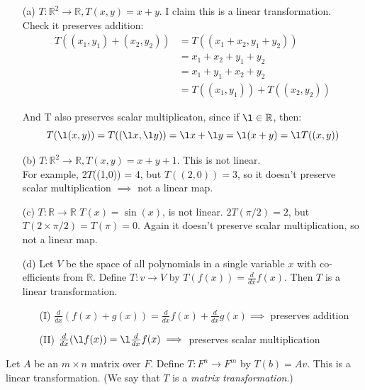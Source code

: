 \documentclass[10pt]{scrartcl}
\begin{document}
\begin{examples}
\begin{itemize}
\item[(a)] $T: \mathbb{R}^2 \to \mathbb{R}, T(x,y) = x+y$. I claim this is a linear transformation.\\
Check it preserves addition: \[
\begin{aligned}
T( (x_1, y_1) + (x_2,y_2) ) &= T ((x_1 + x_2, y_1  + y_2))\\
&= x_1 + x_2 + y_1 + y_2 \\
&= x_1 + y_1 + x_2 + y_2 \\
&= T((x_1,y_1)) + T((x_2,y_2))
\end{aligned}\]

And T also preserves scalar multiplicaton, since if $\l \in \mathbb{R}$, then:
\[
T(\l(x,y)) = T((\l x,\l y)) = \l x + \l y = \l(x+y) = \l T((x,y))\]


\item[(b)] $T: \mathbb{R}^2 \to \mathbb{R}, T(x,y) = x+y + 1$. This is not linear. \\
For example, 2$T$((1,0)) = 4, but $T((2,0)) = 3$, so it doesn't preserve scalar multiplication $\implies$ not a linear map.

\item[(c)] $T: \mathbb{R} \to \mathbb{R}$ $T(x) = \sin(x)$, is not linear.
$2T(\pi/2) = 2$, but $T(2\times \pi/2) = T(\pi) = 0$. Again it doesn't preserve scalar multiplication, so not a linear map.

\item[(d)] Let $V$ be the space of all polynomials in a single variable $x$ with co-efficients from $\mathbb{R}$. Define $T:v \to V$ by $T(f(x)) = \frac{d}{dx}f(x)$. Then $T$ is a linear transformation.
\begin{itemize}
\item[(I)] $\frac{d}{dx}(f(x) + g(x)) = \frac{d}{dx}f(x) + \frac{d}{dx}g(x) \implies$ preserves addition
\item[(II)] $\frac{d}{dx}(\l f(x)) = \l\frac{d}{dx}f(x) \implies $ preserves scalar multiplication
\end{itemize}

\end{itemize}
\end{examples}\vspace*{10pt}

\begin{proposition} Let $A$ be an $m\times n$ matrix over $F$. Define $T: F^n \to F^m$ by $T(b) = Av$. This is a linear transformation. (We say that $T$ is a \emph{matrix transformation}.)	
\end{proposition}
\end{document}
